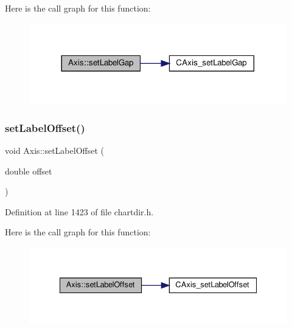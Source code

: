 Here is the call graph for this function\+:
\nopagebreak
\begin{figure}[H]
\begin{center}
\leavevmode
\includegraphics[width=317pt]{class_axis_ae4b909cc52ff784757e92917a18ad917_cgraph}
\end{center}
\end{figure}
\mbox{\label{class_axis_ac032ffeb1b95640f0b15d8e87b4ba02a}} 
\subsubsection{\texorpdfstring{set\+Label\+Offset()}{setLabelOffset()}}
{\footnotesize\ttfamily void Axis\+::set\+Label\+Offset (\begin{DoxyParamCaption}\item[{double}]{offset }\end{DoxyParamCaption})\hspace{0.3cm}{\ttfamily [inline]}}



Definition at line 1423 of file chartdir.\+h.

Here is the call graph for this function\+:
\nopagebreak
\begin{figure}[H]
\begin{center}
\leavevmode
\includegraphics[width=335pt]{class_axis_ac032ffeb1b95640f0b15d8e87b4ba02a_cgraph}
\end{center}
\end{figure}
\mbox{\label{class_axis_a95b7b98d0085dcbe709ec0c0f7df76c1}} 
